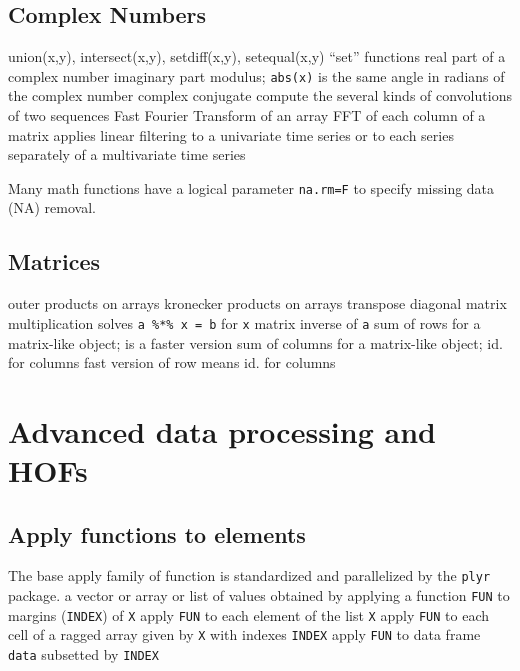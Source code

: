\subsection{Complex Numbers}{{\smalltt union(x,y),  intersect(x,y),  setdiff(x,y),  setequal(x,y)}}
	{``set'' functions}
	{real part of a complex number}
	{imaginary part}
	{modulus; {\tt abs(x)} is the same}
	{angle in radians of the complex number}
	{complex conjugate}
	{compute the several kinds of convolutions of two sequences}
	{Fast Fourier Transform of an array}
	{FFT of each column of a matrix}
	{applies linear filtering to a univariate time series or to each series separately of a multivariate time series}

Many math functions have a logical parameter {\tt na.rm=F} to
specify missing data (NA) removal.

\subsection{Matrices}{}
	{outer products on arrays}
	{kronecker products on arrays}
	{transpose}
	{diagonal}
\cmdS{\%*\%}	{matrix multiplication}
	{solves {\tt a \%*\% x = b} for {\tt x}}
	{matrix inverse of {\tt a}}
	{sum of rows for a matrix-like object;}
	{is a faster version}
	{sum of columns for a matrix-like object;}
	{id. for columns}
	{fast version of row means}
	{id. for columns}

\section{Advanced data processing and HOFs}{}
\subsection{Apply functions to elements}{The base apply family of function is
    standardized and parallelized by the {\tt plyr} package.}
	{a vector or array or list of values obtained by applying a function {\tt FUN} to margins ({\tt INDEX}) of {\tt X}}
	{apply {\tt FUN} to each element of the list {\tt X}}
	{apply {\tt FUN} to each cell of a ragged array given by {\tt X} with indexes {\tt INDEX}}
	{apply {\tt FUN} to data frame {\tt data} subsetted by {\tt INDEX}}
